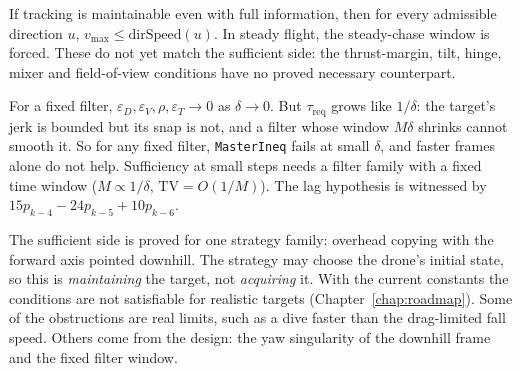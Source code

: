 \begin{theorem}
\label{thm:master-necessary}
\leanok
{}
If tracking is maintainable even with full information, then for every admissible
direction $u$, $v_{\max}\le\mathrm{dirSpeed}(u)$. In steady flight, the steady-chase
window is forced. These do not yet match the sufficient side: the thrust-margin,
tilt, hinge, mixer and field-of-view conditions have no proved necessary counterpart.
\end{theorem}

\begin{theorem}
\label{thm:gap}
\leanok
{}
For a fixed filter, $\varepsilon_D,\varepsilon_V,\rho,\varepsilon_T\to0$ as
$\delta\to0$. But $\tau_{\mathrm{req}}$ grows like $1/\delta$: the target's jerk is
bounded but its snap is not, and a filter whose window $M\delta$ shrinks cannot smooth
it. So for any fixed filter, \texttt{MasterIneq} fails at small $\delta$, and faster
frames alone do not help. Sufficiency at small steps needs a filter family with a
fixed time window ($M\propto1/\delta$, $\mathrm{TV}=O(1/M)$). The lag hypothesis is
witnessed by $15p_{k-4}-24p_{k-5}+10p_{k-6}$.
\end{theorem}

\begin{remark}
The sufficient side is proved for one strategy family: overhead copying with the
forward axis pointed downhill. The strategy may choose the drone's initial state,
so this is \emph{maintaining} the target, not \emph{acquiring} it. With the
current constants the conditions are not satisfiable for realistic targets
(Chapter~\ref{chap:roadmap}). Some of the obstructions are real limits, such as a
dive faster than the drag-limited fall speed. Others come from the design: the
yaw singularity of the downhill frame and the fixed filter window.
\end{remark}
